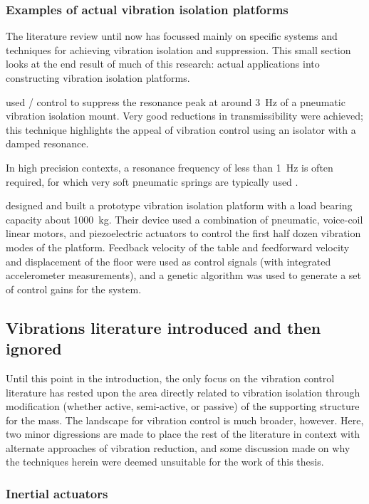 \subsubsection{Examples of actual vibration isolation platforms}

The literature review until now has focussed mainly on specific systems and techniques for achieving vibration isolation and suppression.
This small section looks at the end result of much of this research: actual applications into constructing vibration isolation platforms.

\textcite{chen2007} used \Hinf/ control to suppress the resonance peak at around \SI{3}{Hz} of a pneumatic vibration isolation mount.
Very good reductions in transmissibility were achieved; this technique highlights the appeal of vibration control using an isolator with a damped resonance.

In high precision contexts, a resonance frequency of less than \SI{1}{Hz} is often required, for which very soft pneumatic springs are typically used \cite{kawashima2007}.

\textcite{yoshioka2001} designed and built a prototype vibration isolation platform with a load bearing capacity about \SI{1000}{kg}.
Their device used a combination of pneumatic, voice-coil linear motors, and piezoelectric actuators to control the first half dozen vibration modes of the platform.
Feedback velocity of the table and feedforward velocity and displacement of the floor were used as control signals (with integrated accelerometer measurements), and a genetic algorithm was used to generate a set of control gains for the system.


\subsection{Vibrations literature introduced and then ignored}

Until this point in the introduction, the only focus on the vibration control literature has rested upon the area directly related to vibration isolation through modification (whether active, semi-active, or passive) of the supporting structure for the mass.
The landscape for vibration control is much broader, however.
Here, two minor digressions are made to place the rest of the literature in context with alternate approaches of vibration reduction, and some discussion made on why the techniques herein were deemed unsuitable for the work of this thesis.


\subsubsection{Inertial actuators}

